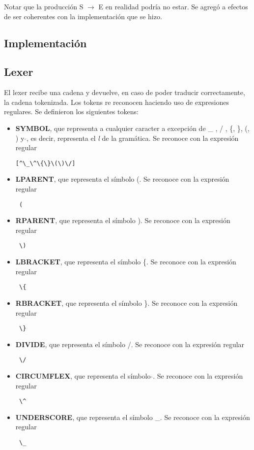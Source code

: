 \indent Notar que la producción  S $\rightarrow$ E en realidad podría no estar. Se agregó a efectos de ser coherentes con la implementación que se hizo.\\ 

\subsection{Implementación}

\subsection{Lexer}

\indent \indent El lexer recibe una cadena y devuelve, en caso de poder traducir correctamente, la cadena tokenizada. Los tokens re reconocen haciendo uso de expresiones regulares. Se definieron los siguientes tokens:\\
\begin{itemize}
\item \textbf{SYMBOL}, que representa a cualquier caracter a excepción de \_ , / , \{, \}, (, ) y  $\hat{}$, es decir, representa el \textit{l} de la gramática. Se reconoce con la expresión regular \begin{verbatim}[^\_\^\{\}\(\)\/]\end{verbatim}
\item \textbf{LPARENT}, que representa el símbolo (. Se reconoce con la expresión regular \begin{verbatim} (\end{verbatim}
\item \textbf{RPARENT}, que representa el símbolo ).  Se reconoce con la expresión regular \begin{verbatim} \) \end{verbatim}
\item \textbf{LBRACKET}, que representa el símbolo \{.  Se reconoce con la expresión regular \begin{verbatim} \{\end{verbatim}
\item \textbf{RBRACKET}, que representa el símbolo \}.  Se reconoce con la expresión regular \begin{verbatim} \}\end{verbatim}
\item \textbf{DIVIDE}, que representa el símbolo /.  Se reconoce con la expresión regular \begin{verbatim} \/\end{verbatim}
\item \textbf{CIRCUMFLEX}, que representa el símbolo $\hat{}$.  Se reconoce con la expresión regular \begin{verbatim} \^ \end{verbatim}
\item \textbf{UNDERSCORE}, que representa el símbolo \_.  Se reconoce con la expresión regular \begin{verbatim} \_ \end{verbatim}
\end{itemize}

